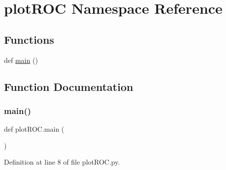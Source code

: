 \hypertarget{namespaceplot_r_o_c}{}\section{plot\+R\+OC Namespace Reference}
\label{namespaceplot_r_o_c}
\subsection*{Functions}
\begin{DoxyCompactItemize}
\item 
def \hyperlink{namespaceplot_r_o_c_a56d3ec45ca342a890aa785bc1eb6e868}{main} ()
\end{DoxyCompactItemize}


\subsection{Function Documentation}
\mbox{\label{namespaceplot_r_o_c_a56d3ec45ca342a890aa785bc1eb6e868}} 
\subsubsection{\texorpdfstring{main()}{main()}}
{\footnotesize\ttfamily def plot\+R\+O\+C.\+main (\begin{DoxyParamCaption}{ }\end{DoxyParamCaption})}



Definition at line 8 of file plot\+R\+O\+C.\+py.

